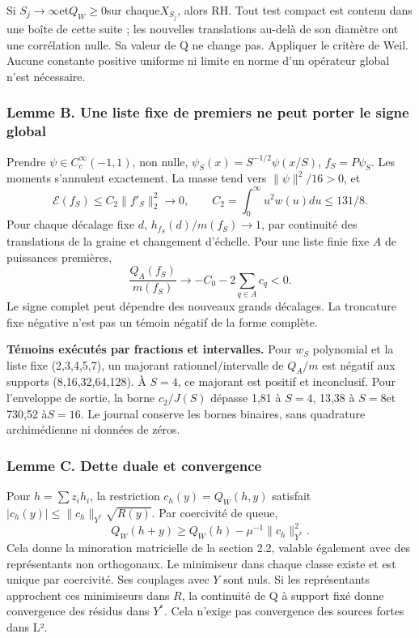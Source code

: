 \documentclass[
  10pt,
  a4paper,
]{article}
\begin{document}
Si \(S_j\to\infty\)et\(Q_W\ge0\)sur chaque\(X_{S_j}\), alors RH. Tout
test compact est contenu dans une boîte de cette suite ; les nouvelles
translations au-delà de son diamètre ont une corrélation nulle. Sa
valeur de Q ne change pas. Appliquer le critère de Weil. Aucune
constante positive uniforme ni limite en norme d'un opérateur global
n'est nécessaire.

\hypertarget{lemme-b.-une-liste-fixe-de-premiers-ne-peut-porter-le-signe-global}{%
\subsubsection{Lemme B. Une liste fixe de premiers ne peut porter le
signe
global}\label{lemme-b.-une-liste-fixe-de-premiers-ne-peut-porter-le-signe-global}}

Prendre \(\psi\in C_c^\infty(-1,1)\), non nulle,
\(\psi_S(x)=S^{-1/2}\psi(x/S)\), \(f_S=P\psi_S\). Les moments s'annulent
exactement. La masse tend vers \(\|\psi\|^2/16>0\), et \[
\mathcal E(f_S)\le C_2\|f'_S\|_2^2\longrightarrow0,
\qquad C_2=\int_0^\infty u^2w(u)du\le131/8.
\] Pour chaque décalage fixe \(d\), \(h_{f_S}(d)/m(f_S)\to1\), par
continuité des translations de la graine et changement d'échelle. Pour
une liste finie fixe \(A\) de puissances premières, \[
\frac{Q_A(f_S)}{m(f_S)}\longrightarrow-C_0-2\sum_{q\in A}c_q<0.
\] Le signe complet peut dépendre des nouveaux grands décalages. La
troncature fixe négative n'est pas un témoin négatif de la forme
complète.

\textbf{Témoins exécutés par fractions et intervalles.} Pour \(w_S\)
polynomial et la liste fixe (2,3,4,5,7), un majorant
rationnel/intervalle de \(Q_A/m\) est négatif aux supports
(8,16,32,64,128). À \(S=4\), ce majorant est positif et inconclusif.
Pour l'enveloppe de sortie, la borne \(c_2/J(S)\) dépasse 1,81 à
\(S=4\), 13,38 à \(S=8\)et 730,52 à\(S=16\). Le journal conserve les
bornes binaires, sans quadrature archimédienne ni données de zéros.

\hypertarget{lemme-c.-dette-duale-et-convergence}{%
\subsubsection{Lemme C. Dette duale et
convergence}\label{lemme-c.-dette-duale-et-convergence}}

Pour \(h=\sum z_ih_i\), la restriction \(c_h(y)=Q_W(h,y)\) satisfait
\(|c_h(y)|\le\|c_h\|_{Y^*}\sqrt{R(y)}\). Par coercivité de queue, \[
Q_W(h+y)\ge Q_W(h)-\mu^{-1}\|c_h\|_{Y^*}^2.
\] Cela donne la minoration matricielle de la section 2.2, valable
également avec des représentants non orthogonaux. Le minimiseur dans
chaque classe existe et est unique par coercivité. Ses couplages avec
\(Y\) sont nuls. Si les représentants approchent ces minimiseurs dans
\(R\), la continuité de Q à support fixé donne convergence des résidus
dans \(Y^*\). Cela n'exige pas convergence des sources fortes dans L².
\end{document}
